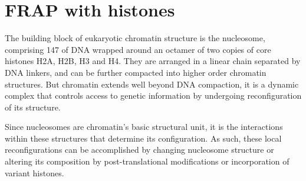 \chapter{FRAP with histones}
\label{ch:frap}



The building block of eukaryotic chromatin structure is the nucleosome, comprising
\SI{147}{\bp} of DNA wrapped around an octamer of two copies of core histones H2A,
H2B, H3 and H4. They are arranged in a linear chain separated by DNA linkers, and
can be further compacted into higher order chromatin structures. But chromatin extends
well beyond DNA compaction, it is a dynamic complex that controls access to genetic
information by undergoing reconfiguration of its structure.

Since nucleosomes are chromatin's basic structural unit, it is the interactions
within these structures that determine its configuration. As such, these local
reconfigurations can be accomplished by changing nucleosome structure or altering
its composition by post-translational modifications or incorporation of variant
histones.

